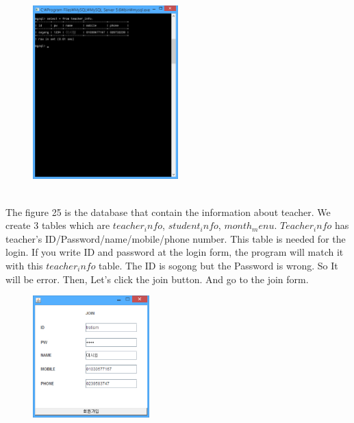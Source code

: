 \documentclass[a4paper,11pt]{IEEEtran}
\begin{document}
{{{~\\
\begin{figure}[!h]
        \centering
        \includegraphics[width=0.5\textwidth, height=0.37\textheight]{usec3.jpg}
        \caption{}
        \label{fig1}
\end{figure}
~\\
The figure 25 is the database that contain the information about teacher. We create 3 tables which are $teacher_info$, $student_info$, $month_menu$. $Teacher_info$ has teacher's ID/Password/name/mobile/phone number. This table is needed for the login. If you write ID and password at the login form, the program will match it with this $teacher_info$ table. The ID is sogong but the Password is wrong. So It will be error. Then, Let’s click the join button. And go to the join form.
~\\
\begin{figure}[!h]
        \centering
        \includegraphics[width=0.4\textwidth]{usec4.jpg}
        \caption{}
        \label{fig1}
\end{figure}
~\\
}}}
\end{document}
